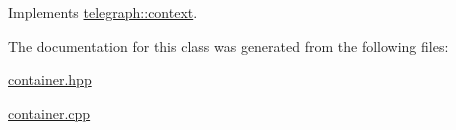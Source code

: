 Implements \hyperlink{classtelegraph_1_1context_a1f600d6159df21dd2750b1c706ca3412}{telegraph\+::context}.



The documentation for this class was generated from the following files\+:\begin{DoxyCompactItemize}
\item 
\hyperlink{container_8hpp}{container.\+hpp}\item 
\hyperlink{container_8cpp}{container.\+cpp}\end{DoxyCompactItemize}

